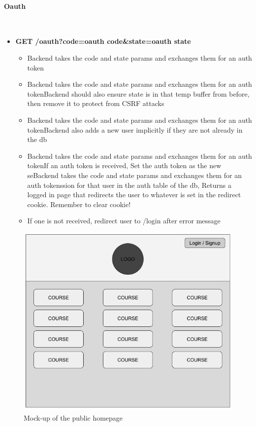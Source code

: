 \documentclass{article}
\begin{document}
\paragraph{Oauth}\\
\begin{itemize}
    \item \textbf{GET /oauth?code=oauth code\&state=oauth state}
    \begin{itemize}
        \item Backend takes the code and state params and exchanges them for an auth token
        \item Backend takes the code and state params and exchanges them for an auth tokenBackend should also ensure state is in that temp buffer from before, then remove it to protect from CSRF attacks
        \item Backend takes the code and state params and exchanges them for an auth tokenBackend also adds a new user implicitly if they are not already in the db
        \item Backend takes the code and state params and exchanges them for an auth tokenIf an auth token is received, Set the auth token as the new seBackend takes the code and state params and exchanges them for an auth tokenssion for that user in the auth table of the db, Returns a logged in page that redirects the user to whatever is set in the redirect cookie. Remember to clear cookie!
        \item If one is not received, redirect user to /login after error message
    \end{itemize}
\end{itemize}
\begin{figure}[h]
    \caption{Mock-up of the public homepage}
    \includegraphics[width=\textwidth]{public_homepage}
\end{figure}
\end{document}

